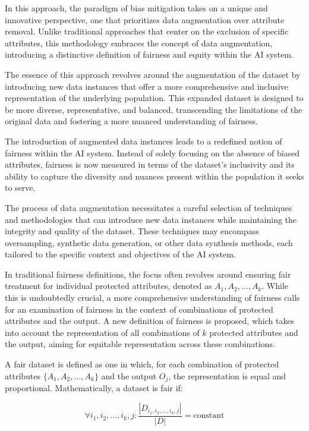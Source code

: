 In this approach, the paradigm of bias mitigation takes on a unique and innovative perspective, one that prioritizes data augmentation over attribute removal. Unlike traditional approaches that center on the exclusion of specific attributes, this methodology embraces the concept of data augmentation, introducing a distinctive definition of fairness and equity within the AI system.

The essence of this approach revolves around the augmentation of the dataset by introducing new data instances that offer a more comprehensive and inclusive representation of the underlying population. This expanded dataset is designed to be more diverse, representative, and balanced, transcending the limitations of the original data and fostering a more nuanced understanding of fairness. 

The introduction of augmented data instances leads to a redefined notion of fairness within the AI system. Instead of solely focusing on the absence of biased attributes, fairness is now measured in terms of the dataset's inclusivity and its ability to capture the diversity and nuances present within the population it seeks to serve. 

The process of data augmentation necessitates a careful selection of techniques and methodologies that can introduce new data instances while maintaining the integrity and quality of the dataset. These techniques may encompass oversampling, synthetic data generation, or other data synthesis methods, each tailored to the specific context and objectives of the AI system.

In traditional fairness definitions, the focus often revolves around ensuring fair treatment for individual protected attributes, denoted as $A_1, A_2, \ldots, A_k$. While this is undoubtedly crucial, a more comprehensive understanding of fairness calls for an examination of fairness in the context of combinations of protected attributes and the output. A new definition of fairness is proposed, which takes into account the representation of all combinations of $k$ protected attributes and the output, aiming for equitable representation across these combinations.

A fair dataset is defined as one in which, for each combination of protected attributes $\{A_1, A_2, \ldots, A_k\}$ and the output $O_j$, the representation is equal and proportional. Mathematically, a dataset is fair if:

\[
\forall i_1, i_2, \ldots, i_k, j: \frac{|D_{i_1, i_2, \ldots, i_k, j}|}{|D|} = \text{constant}
\]

